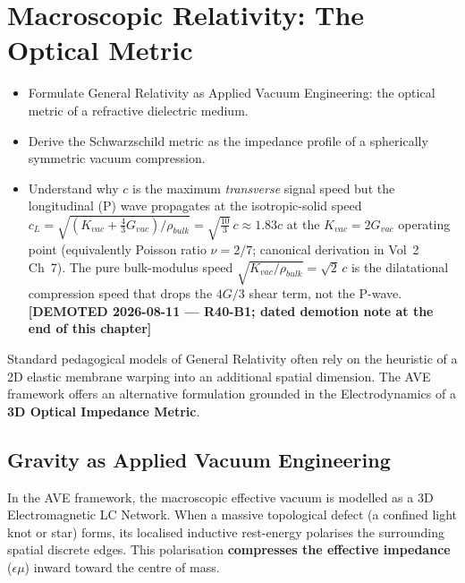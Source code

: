\chapter{Macroscopic Relativity: The Optical Metric}
\label{ch:relativity}


\begin{objectivebox}
\begin{itemize}
    \item Formulate General Relativity as Applied Vacuum Engineering: the optical metric of a refractive dielectric medium.
    \item Derive the Schwarzschild metric as the impedance profile of a spherically symmetric vacuum compression.
    \item Understand why $c$ is the maximum \emph{transverse} signal speed but the longitudinal (P) wave propagates at the isotropic-solid speed $c_L = \sqrt{(K_{vac} + \tfrac{4}{3}G_{vac})/\rho_{bulk}} = \sqrt{\tfrac{10}{3}}\,c \approx 1.83c$ at the $K_{vac} = 2G_{vac}$ operating point (equivalently Poisson ratio $\nu = 2/7$; canonical derivation in Vol~2 Ch~7). The pure bulk-modulus speed $\sqrt{K_{vac}/\rho_{bulk}} = \sqrt{2}\,c$ is the dilatational compression speed that drops the $4G/3$ shear term, not the P-wave. \textbf{[DEMOTED 2026-08-11 --- R40-B1; dated demotion note at the end of this chapter]}
\end{itemize}
\end{objectivebox}

Standard pedagogical models of General Relativity often rely on the heuristic of a 2D elastic membrane warping into an additional spatial dimension. The AVE framework offers an alternative formulation grounded in the Electrodynamics of a \textbf{3D Optical Impedance Metric}.

\section{Gravity as Applied Vacuum Engineering}
In the AVE framework, the macroscopic effective vacuum is modelled as a 3D Electromagnetic LC Network. When a massive topological defect (a confined light knot or star) forms, its localised inductive rest-energy polarises the surrounding spatial discrete edges. This polarisation \textbf{compresses the effective impedance} ($\epsilon\mu$) inward toward the centre of mass.

